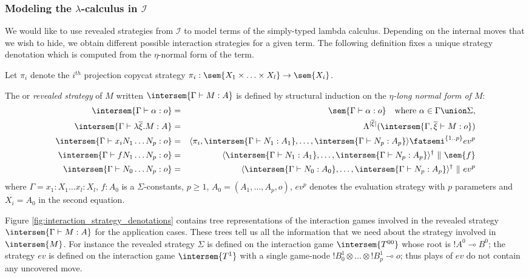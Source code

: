 \subsubsection{Modeling the $\lambda$-calculus in $\mathcal{I}$}

We would like to use revealed strategies from $\mathcal{I}$ to model terms of
the simply-typed lambda calculus.
Depending on the internal moves that we wish to hide, we obtain different possible interaction strategies for a given term.
The following definition fixes a unique strategy denotation which is computed from the $\eta$-normal form of the term.

\begin{definition}
\label{dfn:interactionstrategy_ofterms}
Let $\pi_i$ denote the $i^{th}$ projection copycat strategy $\pi_i : \sem{X_1 \times \ldots \times X_l} \rightarrow \sem{X_i}$.

The  or \emph{revealed strategy} of
$M$ written $\intersem{\Gamma \vdash M : A}$ is defined by structural induction on the \emph{$\eta$-long normal form of $M$}:
\begin{eqnarray*}
\intersem{\Gamma \vdash \alpha : o} &=&
\sem{\Gamma \vdash \alpha : o} \quad \mbox{where } \alpha \in \Gamma \union \Sigma,\\
\intersem{\Gamma \vdash \lambda \overline{\xi} . M  : A} &=& \Lambda^{|\overline{\xi}|}(\intersem{\Gamma, \overline{\xi} \vdash M : o })  \\
\intersem{\Gamma  \vdash x_i N_1 \ldots N_p :o} &=& \langle \pi_i, \intersem{\Gamma \vdash N_1 : A_1}, \ldots, \intersem{\Gamma \vdash N_p : A_p}  \rangle \fatsemi ^{\{1..p\}} ev^p \\
\intersem{\Gamma \vdash f N_1 \ldots N_p : o} &=& \langle \intersem{\Gamma \vdash N_1 : A_1}, \ldots, \intersem{\Gamma \vdash N_p : A_p} \rangle^\dagger\  \|\ \sem{f} \\
\intersem{\Gamma \vdash N_0 \ldots N_p : o} &=& \langle \intersem{\Gamma \vdash N_0 : A_0}, \ldots, \intersem{\Gamma \vdash N_p : A_p}  \rangle^\dagger\ \|\ ev^p
\end{eqnarray*}
where $\Gamma = x_1 : X_1 \ldots x_l : X_l$, $f : A_0$ is a $\Sigma$-constants, $p\geq 1$, $A_0 =
(A_1,\ldots,A_p,o)$, $ev^p$ denotes the evaluation strategy with
$p$ parameters and $X_i = A_0$ in the second equation.
\end{definition}

Figure \ref{fig:interaction_strategy_denotations} contains tree
representations of the interaction games involved in the revealed
strategy $\intersem{\Gamma \vdash M : A}$ for the application cases.
These trees tell us all the information that we need about the
strategy involved in $\intersem{M}$. For instance the revealed
strategy $\Sigma$ is defined on the interaction game
$\intersem{T^{00}}$ whose root is $!A^0 \multimap B^0$; the strategy
$ev$ is defined on the interaction game $\intersem{T^1}$ with a
single game-node $!B_0^1 \otimes \ldots \otimes !B_p^1 \multimap o$;
thus plays of $ev$ do not contain any uncovered move.


